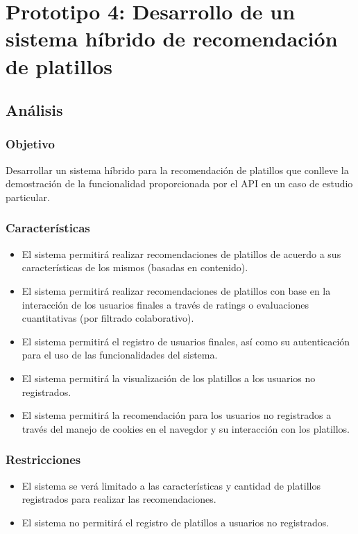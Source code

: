 \chapter{Prototipo 4: Desarrollo de un sistema híbrido de recomendación de platillos}
\section{Análisis}
\subsection{Objetivo}
Desarrollar un sistema híbrido para la recomendación de platillos que conlleve la demostración de la funcionalidad proporcionada por el API en un caso de estudio particular.

\subsection{Características}
\begin{itemize}
	\item El sistema permitirá realizar recomendaciones de platillos de acuerdo a sus características de los mismos (basadas en contenido).
	\item El sistema permitirá realizar recomendaciones de platillos con base en la interacción de los usuarios finales a través de ratings o evaluaciones cuantitativas (por filtrado colaborativo).
	\item El sistema permitirá el registro de usuarios finales, así como su autenticación para el uso de las funcionalidades del sistema.
	\item El sistema permitirá la visualización de los platillos a los usuarios no registrados.
	\item El sistema permitirá la recomendación para los usuarios no registrados a través del manejo de cookies en el navegdor y su interacción con los platillos.
\end{itemize}

\subsection{Restricciones}
\begin{itemize}
	\item El sistema se verá limitado a las características y cantidad de platillos registrados para realizar las recomendaciones.
	\item El sistema no permitirá el registro de platillos a usuarios no registrados.
\end{itemize}

